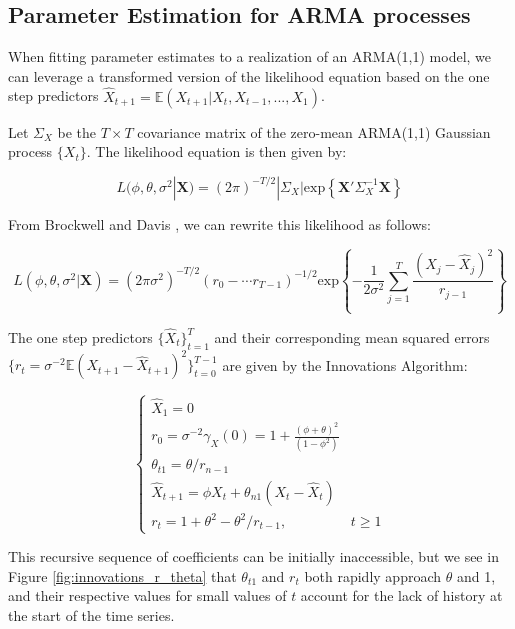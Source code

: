 \subsection{Parameter Estimation for ARMA processes}

When fitting parameter estimates to a realization of an ARMA(1,1) model, we can leverage a transformed version of the likelihood equation based on the one step predictors $\hat{X}_{t+1} = \mathbb{E}(X_{t+1}|X_t,X_{t-1},...,X_1)$.

Let $\Sigma_X$ be the $T \times T$ covariance matrix of the zero-mean ARMA(1,1) Gaussian process $\{X_t\}$. The likelihood equation is then given by:

$$L(\phi,\theta,\sigma^2|\mathbf{X}) = (2\pi)^{-T/2}|\Sigma_X|\text{exp}\left\{\mathbf{X}'\Sigma_X^{-1}\mathbf{X}\right\}$$ 

From Brockwell and Davis \cite{BrockwellDavis1991}, we can rewrite this likelihood as follows:

$$ L(\phi,\theta,\sigma^2|\mathbf{X}) = (2\pi\sigma^2)^{-T/2}(r_0 - \cdots r_{T-1})^{-1/2}\text{exp}\left\{ -\frac{1}{2\sigma^2}\sum_{j=1}^T\frac{(X_j - \hat{X}_j)^2}{r_{j-1}} \right\}$$

The one step predictors $\{\hat{X}_t\}_{t=1}^T$ and their corresponding mean squared errors $\{r_t = \sigma^{-2}\mathbb{E}(X_{t+1} - \hat{X}_{t+1})^2\}_{t=0}^{T-1}$ are given by the Innovations Algorithm:


\begin{equation}
    \label{eq:innovations_r_theta}
    \begin{cases}
    \hat{X}_1 = 0 \\
    r_0 = \sigma^{-2}\gamma_X(0) = 1 + \frac{(\phi + \theta)^2}{(1 - \phi^2)} \\
    \theta_{t1}= \theta / r_{n-1}\\
        \hat{X}_{t+1} = \phi X_t + \theta_{n1}(X_t - \hat{X}_t) \\
    r_t = 1 + \theta^2 - \theta^2/r_{t-1}, & t \geq 1 
\end{cases}
\end{equation}



This recursive sequence of coefficients can be initially inaccessible, but we see in Figure \ref{fig:innovations_r_theta} that $\theta_{t1}$ and $r_t$ both rapidly approach $\theta$ and 1, and their respective values for small values of $t$ account for the lack of history at the start of the time series.

